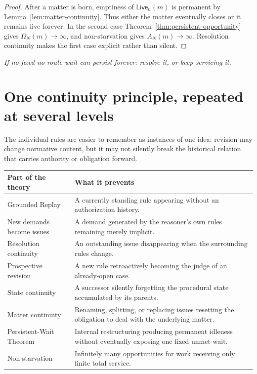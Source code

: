 \documentclass[11pt]{article}
\theoremstyle{definition}
\theoremstyle{remark}
\newcommand{\Live}{\mathsf{Live}}
\begin{document}
\begin{proof}
After a matter is born, emptiness of $\Live_n(m)$ is permanent by
Lemma~\ref{lem:matter-continuity}. Thus either the matter eventually closes or
it remains live forever. In the second case Theorem~\ref{thm:persistent-opportunity}
gives $\Omega_N(m)\to\infty$, and non-starvation gives $A_N(m)\to\infty$.
Resolution continuity makes the first case explicit rather than silent.
\end{proof}

\begin{center}
\emph{If no fixed no-route wait can persist forever: resolve it, or keep servicing it.}
\end{center}

\section{One continuity principle, repeated at several levels}\label{sec:picture}

The individual rules are easier to remember as instances of one idea:
revision may change normative content, but it may not silently break the
historical relation that carries authority or obligation forward.

\begin{center}
\begin{tabular}{@{}p{}p{}@{}}
\toprule
\textbf{Part of the theory} & \textbf{What it prevents} \\
\midrule
Grounded Replay & A currently standing rule appearing without an authorization history. \\
New demands become issues & A demand generated by the reasoner's own rules remaining merely implicit. \\
Resolution continuity & An outstanding issue disappearing when the surrounding rules change. \\
Prospective revision & A new rule retroactively becoming the judge of an already-open case. \\
State continuity & A successor silently forgetting the procedural state accumulated by its parents. \\
Matter continuity & Renaming, splitting, or replacing issues resetting the obligation to deal with the underlying matter. \\
Persistent-Wait Theorem & Internal restructuring producing permanent idleness without eventually exposing one fixed unmet wait. \\
Non-starvation & Infinitely many opportunities for work receiving only finite total service. \\
\bottomrule
\end{tabular}
\end{center}
\end{document}
